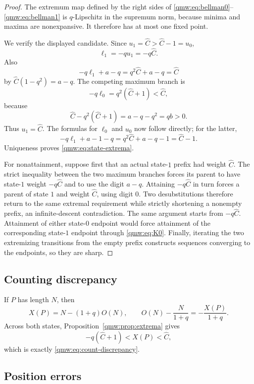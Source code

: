 \documentclass[11pt]{article}
\numberwithin{equation}{section}
\theoremstyle{definition}
\theoremstyle{remark}
\begin{document}
\begin{proof}
The extremum map defined by the right sides of
\eqref{qmw:eq:bellman0}--\eqref{qmw:eq:bellman1} is $q$-Lipschitz in the supremum
norm, because minima and maxima are nonexpansive.  It therefore has at most
one fixed point.

We verify the displayed candidate.  Since $u_1={\widehat C}> {\widehat C}-1=u_0$,
\[
\ell_1=-qu_1=-q{\widehat C}.
\]
Also
\[
-q\ell_1+a-q=q^2{\widehat C}+a-q={\widehat C}
\]
by ${\widehat C}(1-q^2)=a-q$.  The competing maximum branch is
\[
-q\ell_0=q^2({\widehat C}+1)<{\widehat C},
\]
because
\[
{\widehat C}-q^2({\widehat C}+1)=a-q-q^2=qb>0.
\]
Thus $u_1={\widehat C}$.  The formulas for $\ell_0$ and $u_0$ now follow directly;
for the latter,
\[
-q\ell_1+a-1-q=q^2{\widehat C}+a-q-1={\widehat C}-1.
\]
Uniqueness proves \eqref{qmw:eq:state-extrema}.

For nonattainment, suppose first that an actual state-$1$ prefix had weight
${\widehat C}$.  The strict inequality between the two maximum branches forces its
parent to have state-$1$ weight $-q{\widehat C}$ and to use the digit $a-q$.  Attaining
$-q{\widehat C}$ in turn forces a parent of state $1$ and weight ${\widehat C}$, using digit $0$.
Two desubstitutions therefore return to the same extremal requirement while
strictly shortening a nonempty prefix, an infinite-descent contradiction.
The same argument starts from $-q{\widehat C}$.  Attainment of either state-$0$ endpoint
would force attainment of the corresponding state-$1$ endpoint through
\eqref{qmw:eq:K0}.  Finally, iterating the two extremizing transitions from the
empty prefix constructs sequences converging to the endpoints, so they are
sharp.
\end{proof}

\subsection{Counting discrepancy}

If $P$ has length $N$, then
\begin{equation}\label{qmw:eq:Xcount}
X(P)=N-(1+q)O(N),
\qquad
O(N)-\frac{N}{1+q}=-\frac{X(P)}{1+q}.
\end{equation}
Across both states, Proposition~\ref{qmw:prop:extrema} gives
\[
-q({\widehat C}+1)<X(P)<{\widehat C},
\]
which is exactly \eqref{qmw:eq:count-discrepancy}.

\subsection{Position errors}
\end{document}
